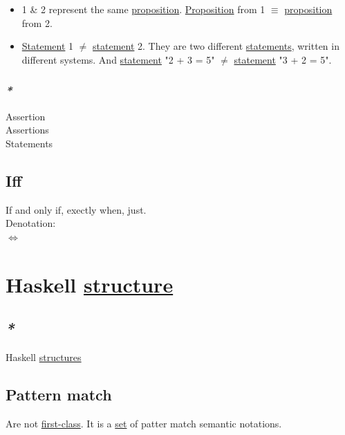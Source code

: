 \documentclass[a4paper,14pt,oneside]{book}
\begin{document}
{\begin{enumerate}
\begin{itemize}
\item 1 \& 2 represent the same \hyperref[org7fbfcf5]{proposition}. \hyperref[org7fbfcf5]{Proposition} from 1 \(\equiv\) \hyperref[org7fbfcf5]{proposition} from 2.\\

\item \hyperref[org03c7362]{Statement} 1 \(\ne\) \hyperref[org03c7362]{statement} 2. They are two different \hyperref[orgf6daaf5]{statements}, written in different systems. And \hyperref[org03c7362]{statement} "2 + 3 = 5" \(\ne\) \hyperref[org03c7362]{statement} "3 + 2 = 5".\\
\end{itemize}
\end{enumerate}

\subsection{\emph{*}}
\label{sec:org7ce1a4c}

\label{orgb51084c}Assertion\\
\label{org05f2377}Assertions\\
\label{orgf6daaf5}Statements\\

\section{\label{org514b01f}Iff}
\label{sec:org191413c}
If and only if, exectly when, just.\\
Denotation:\\
\(\iff\)\\

\chapter{Haskell \hyperref[org080800e]{structure}}
\label{sec:org50ce4bb}
\section{\emph{*}}
\label{sec:org6de2443}
Haskell \hyperref[org29bb033]{structures}\\

\section{\label{org8c05feb}Pattern match}
\label{sec:orgbd6327b}
Are not \hyperref[org0332f07]{first-class}. It is a \hyperref[org0726f94]{set} of patter match semantic notations.\\

}
\end{document}
